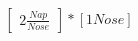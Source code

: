 \documentclass[preview]{standalone}
\begin{document}
\begin{align*}
\begin{bmatrix} 2 \frac{Nap}{Nose} \end{bmatrix} * [1 Nose]
\end{align*}
\end{document}
